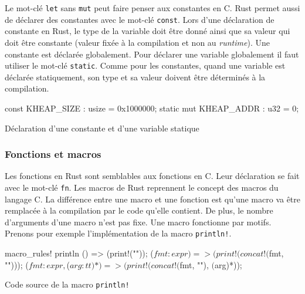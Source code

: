 Le mot-clé \texttt{let} sans \texttt{mut} peut faire penser
aux constantes en C. Rust permet aussi de déclarer des constantes avec le mot-clé
\texttt{const}. Lors d'une déclaration de constante en Rust, le type
de la variable doit être donné ainsi que sa valeur qui doit être constante (valeur
fixée à la compilation et non au \textit{runtime}). Une constante est déclarée
globalement. Pour déclarer une variable globalement il faut utiliser le mot-clé
\texttt{static}. Comme pour les constantes, quand une variable est déclarée
statiquement, son type et sa valeur doivent être déterminés à la compilation.

\begin{code}
\begin{rustcode}
const KHEAP_SIZE        : usize = 0x1000000;
static mut KHEAP_ADDR   : u32   = 0;
\end{rustcode}
\caption{Déclaration d'une constante et d'une variable statique}
\label{lst:rust:var4}
\end{code} \bigbreak


\subsubsection{Fonctions et macros}
Les fonctions en Rust sont semblables aux fonctions en C. Leur déclaration se fait
avec le mot-clé \texttt{fn}. Les macros de Rust reprennent le concept
des macros du langage C. La différence entre une macro et une fonction est qu'une
macro va être remplacée à la compilation par le code qu'elle contient. De plus,
le nombre d'arguments d'une macro n'est pas fixe. Une macro fonctionne par motifs.
Prenons pour exemple l'implémentation de la macro \texttt{println!}. \\

\begin{code}
\begin{rustcode}
macro_rules! println {
    () => (print!("\n"));
    ($fmt:expr) => (print!(concat!($fmt, "\n")));
    ($fmt:expr, $($arg:tt)*) => (print!(concat!($fmt, "\n"), $($arg)*));
}
\end{rustcode}
\caption{Code source de la macro \texttt{println!}}
\label{lst:rust:macro}
\end{code} \bigbreak

